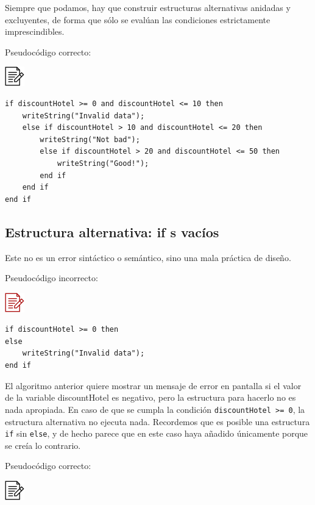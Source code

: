 \documentclass[
]{book}
\begin{document}
Siempre que podamos, hay que construir estructuras alternativas anidadas y excluyentes, de forma que sólo se evalúan las condiciones estrictamente imprescindibles.

Pseudocódigo correcto:

\includegraphics{./img/alg.png}

\begin{verbatim}
if discountHotel >= 0 and discountHotel <= 10 then
    writeString("Invalid data");
    else if discountHotel > 10 and discountHotel <= 20 then
        writeString("Not bad");
        else if discountHotel > 20 and discountHotel <= 50 then
            writeString("Good!");
        end if    
    end if
end if
\end{verbatim}

\hypertarget{estructura-alternativa-if-s-vacuxedos}{%
\subsection{Estructura alternativa: if s vacíos}\label{estructura-alternativa-if-s-vacuxedos}}

Este no es un error sintáctico o semántico, sino una mala práctica de diseño.

Pseudocódigo incorrecto:

\includegraphics{./img/alg_err.png}

\begin{verbatim}
if discountHotel >= 0 then
else
    writeString("Invalid data");
end if
\end{verbatim}

El algoritmo anterior quiere mostrar un mensaje de error en pantalla si el valor de la variable discountHotel es negativo, pero la estructura para hacerlo no es nada apropiada. En caso de que se cumpla la condición \texttt{discountHotel\ \textgreater{}=\ 0}, la estructura alternativa no ejecuta nada. Recordemos que es posible una estructura \texttt{if} sin \texttt{else}, y de hecho parece que en este caso haya añadido únicamente porque se creía lo contrario.

Pseudocódigo correcto:

\includegraphics{./img/alg.png}
\end{document}
